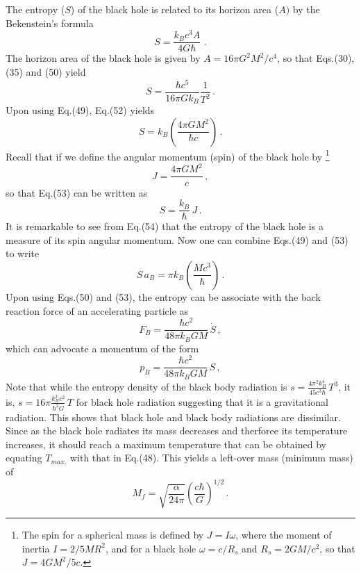 \documentclass[a4]{epl2}
\begin{document}
The entropy ($S$) of the black hole is related to its horizon area ($A)$ by the Bekenstein's  formula \textcolor[rgb]{0.00,0.07,1.00}{\cite{entropy}}
\begin{equation}
S=\frac{k_Bc^3A}{4G\hbar}\,\,.
\end{equation}
The horizon area of the black hole is given by $A=16\pi G^2M^2/c^4$, so that Eqs.(30), (35) and (50) yield
\begin{equation}
S=\frac{\hbar c^5}{16 \pi G k_B}\frac{1}{T^2}\,.
\end{equation}
Upon using Eq.(49), Eq.(52) yields
\begin{equation}
 S=k_B\left(\frac{4\pi GM^2}{\hbar c}\right)\,.
\end{equation}
Recall that if we define the angular momentum (spin) of the black hole by \footnote{The spin for a spherical mass is defined by $J=I\omega$, where the moment of inertia $I=2/5 MR^2$,  and for a black hole $\omega=c/R_s$ and $R_s=2GM/c^2$, so that $J=4GM^2/5c$.}
$$J=\frac{4\pi GM^2}{c}\,,$$
so that Eq.(53) can be written as
\begin{equation}
 S=\frac{k_B}{\hbar}\, J\,.
\end{equation}
It is remarkable to see from Eq.(54) that the entropy of the black hole is a measure of its  spin angular momentum. Now one can combine Eqs.(49) and (53) to write
\begin{equation}
 S\,a_B=\pi k_B\left(\frac{Mc^3}{\hbar}\right)\,.
\end{equation}
Upon using Eqs.(50) and (53), the entropy can be associate with the back reaction force of an accelerating particle as
\begin{equation}
F_B=\frac{\hbar c^2}{48 \pi k_B GM}\, \dot S\,,
\end{equation}
which can advocate a momentum of the form
\begin{equation}
p_B=\frac{\hbar c^2}{48 \pi k_B GM}\,  S\,,
\end{equation}
Note that while the entropy density of the black body radiation is $s=\frac{4\pi^2k_B^4}{45c^3\hbar}\, T^3$, it is, $s=16 \pi \frac{k_B^2c^2}{\hbar^2G}\, T$ for black hole radiation suggesting that it is a gravitational radiation. This shows that black hole and black body radiations are dissimilar. Since as the black hole radiates its mass decreases and therforee its temperature increases, it should reach a maximum temperature that can be obtained by equating $T_{max.}$ with that in Eq.(48). This yields a left-over mass (minimum mass)  of
\begin{equation}
M_f=\sqrt{\frac{\alpha}{24\pi }}\left(\frac{c\hbar}{G}\right)^{1/2}\,.
\end{equation}
\end{document}
